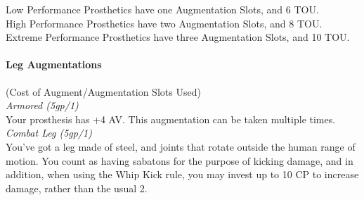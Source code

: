 \documentclass[a4paper, twocolumn, openany]{book}
\newlength{\indentlen}
\newcommand{\tabto}[1]{\setlength{\leftskip}{#1\indentlen}}
\begin{document}
{
Low Performance Prosthetics have one Augmentation Slots, and 6 TOU.\\
High Performance Prosthetics have two Augmentation Slots, and 8 TOU.\\
Extreme Performance Prosthetics have three Augmentation Slots, and 10 TOU.\\

\paragraph{Leg Augmentations} (Cost of Augment/Augmentation Slots Used)\\

\tabto{1}
	{\slshape Armored (5gp/1)\\}
	Your prosthesis has +4 AV. This augmentation can be taken multiple times.\\

	{\slshape Combat Leg (5gp/1)\\}
	You’ve got a leg made of steel, and joints that rotate outside the human range of motion. You
	count as having sabatons for the purpose of kicking damage, and in addition, when using the
	Whip Kick rule, you may invest up to 10 CP to increase damage, rather than the usual 2.\\

}
\end{document}
